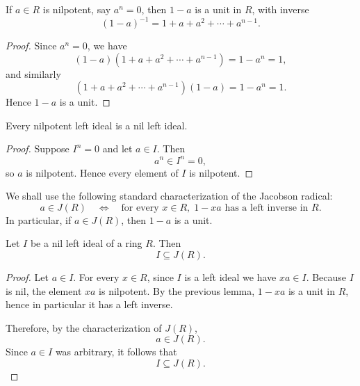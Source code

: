 \begin{lemma}
    If $a\in R$ is nilpotent, say $a^n=0$, then $1-a$ is a unit in $R$, with inverse
    \[
        (1-a)^{-1}=1+a+a^2+\cdots+a^{n-1}.
    \]
\end{lemma}

\begin{proof}
    Since $a^n=0$, we have
    \[
        (1-a)(1+a+a^2+\cdots+a^{n-1})=1-a^n=1,
    \]
    and similarly
    \[
        (1+a+a^2+\cdots+a^{n-1})(1-a)=1-a^n=1.
    \]
    Hence $1-a$ is a unit.
\end{proof}

\begin{lemma}
    Every nilpotent left ideal is a nil left ideal.
\end{lemma}

\begin{proof}
    Suppose $I^n=0$ and let $a\in I$. Then
    \[
        a^n\in I^n=0,
    \]
    so $a$ is nilpotent. Hence every element of $I$ is nilpotent.
\end{proof}

\begin{remark}
    We shall use the following standard characterization of the Jacobson radical:
    \[
        a\in J(R)
        \quad\Longleftrightarrow\quad
        \text{for every }x\in R,\; 1-xa \text{ has a left inverse in }R.
    \]
    In particular, if $a\in J(R)$, then $1-a$ is a unit.
\end{remark}

\begin{theorem}
    Let $I$ be a nil left ideal of a ring $R$. Then
    \[
        I\subseteq J(R).
    \]
\end{theorem}

\begin{proof}
    Let $a\in I$. For every $x\in R$, since $I$ is a left ideal we have $xa\in I$. Because $I$
    is nil, the element $xa$ is nilpotent. By the previous lemma, $1-xa$ is a unit in $R$, hence
    in particular it has a left inverse.

    Therefore, by the characterization of $J(R)$,
    \[
        a\in J(R).
    \]
    Since $a\in I$ was arbitrary, it follows that
    \[
        I\subseteq J(R).
    \]
\end{proof}

